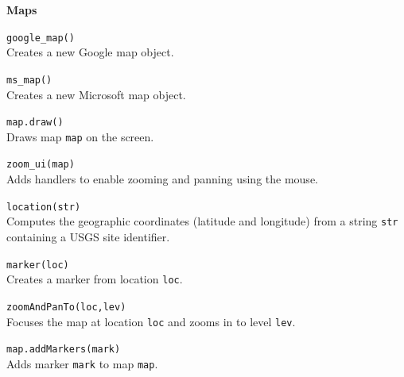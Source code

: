 \documentclass[10pt,twocolumn]{article}
\begin{document}
\noindent\textbf{\large Maps}
\begin{description}
\item{\texttt{google\_map()}}\ \\[.25em]
%
Creates a new Google map object.

\item{\texttt{ms\_map()}}\ \\[.25em]
Creates a new Microsoft map object.

\item{\texttt{map.draw()}}\ \\[.25em] 
Draws map \texttt{map} on the screen.

\item{\texttt{zoom\_ui(map)}}\ \\[.25em] 
Adds handlers to enable zooming and panning using the mouse.

\item{\texttt{location(str)}}\ \\[.25em] 
Computes the geographic coordinates (latitude and longitude) from a
string \texttt{str} containing a USGS site identifier.

\item{\texttt{marker(loc)}}\ \\[.25em] 
Creates a marker from location \texttt{loc}.

\item{\texttt{zoomAndPanTo(loc,lev)}}\ \\[.25em] 
Focuses the map at location \texttt{loc} and zooms in to level \texttt{lev}.

\item{\texttt{map.addMarkers(mark)}}\ \\[.25em] 
Adds marker \texttt{mark} to map \texttt{map}. 

\end{description}

\balance

\bigskip
\end{document}
